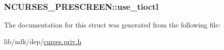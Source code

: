 \hypertarget{struct_n_c_u_r_s_e_s___p_r_e_s_c_r_e_e_n_a4021cf4916ddc7e508c61fe246ce27a8}{
\subsubsection[{use\-\_\-tioctl}]{ N\-C\-U\-R\-S\-E\-S\-\_\-\-P\-R\-E\-S\-C\-R\-E\-E\-N\-::use\-\_\-tioctl}}\label{struct_n_c_u_r_s_e_s___p_r_e_s_c_r_e_e_n_a4021cf4916ddc7e508c61fe246ce27a8}


The documentation for this struct was generated from the following file\-:\begin{DoxyCompactItemize}
\item 
lib/ndk/dep/\hyperlink{curses_8priv_8h}{curses.\-priv.\-h}\end{DoxyCompactItemize}
